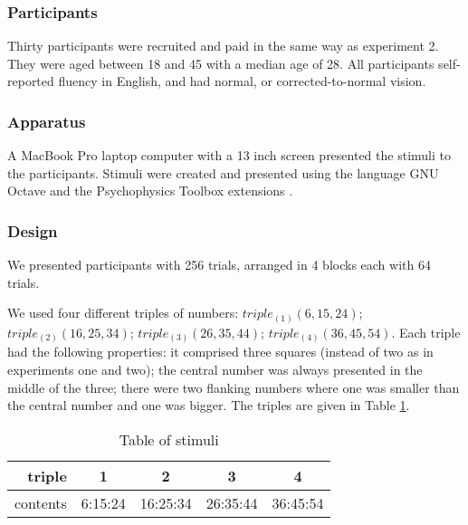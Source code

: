 \documentclass[doc,floatmark]{apa}
\begin{document}
\subsubsection{Participants}
Thirty participants were recruited and paid in the same way as experiment 2. They were aged between 18 and 45 with a median age of 28. All participants self-reported fluency in English, and had normal, or corrected-to-normal vision.

\subsubsection{Apparatus}
A MacBook Pro laptop computer with a 13 inch screen presented the stimuli to the participants. Stimuli were created and presented using the language GNU Octave \cite{eaton:2002} and the Psychophysics Toolbox extensions \cite{ptbx1, ptbx2}.

\subsubsection{Design}
We presented participants with 256 trials, arranged in 4 blocks each with 64 trials.

We used four different triples of numbers: $triple_{(1)}(6,15,24)$; $triple_{(2)}(16,25,34)$; $triple_{(3)}(26,35,44)$; $triple_{(4)}(36,45,54)$. Each triple had the following properties: it comprised three squares (instead of two as in experiments one and two); the central number was always presented in the middle of the three; there were two flanking numbers where one was smaller than the central number and one was bigger. The triples are given in Table \ref{tablee3}.

\begin{table}[tbp]
\caption{Table of stimuli}
\label{tablee3}
\begin{tabular}{rcccc}
triple&1              &2              &3              & 4\\
              \hline
contents              &6:15:24  &16:25:34 &26:35:44&36:45:54 \\
\end{tabular}
\end{table}
\end{document}
